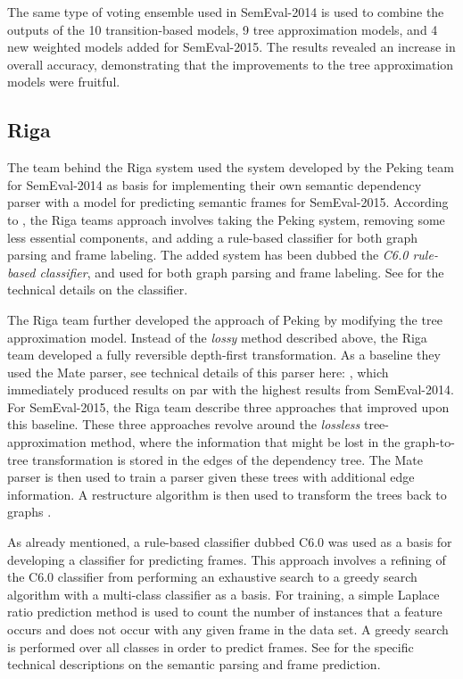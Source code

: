 The same type of voting ensemble used in SemEval-2014 is used to combine the outputs of the 10 transition-based models, 9 tree approximation models, and 4 new weighted models added for SemEval-2015. The results revealed an increase in overall accuracy, demonstrating that the improvements to the tree approximation models were fruitful.


\subsection{Riga}

The team behind the Riga system used the system developed by the Peking team for SemEval-2014 as basis for implementing their own semantic dependency parser with a model for predicting semantic frames for SemEval-2015. According to , the Riga teams approach involves taking the Peking system, removing some less essential components, and adding a rule-based classifier for both graph parsing and frame labeling. The added system has been dubbed the \textit{C6.0 rule-based classifier}, and used for both graph parsing and frame labeling. See  for the technical details on the classifier.

The Riga team further developed the approach of Peking by modifying the tree approximation model. Instead of the \textit{lossy} method described above, the Riga team developed a fully reversible depth-first transformation. As a baseline they used the Mate parser, see technical details of this parser here: \cite{Boh:10}, which immediately produced results on par with the highest results from SemEval-2014. For SemEval-2015, the Riga team describe three approaches that improved upon this baseline. These three approaches revolve around the \textit{lossless} tree-approximation method, where the information that might be lost in the graph-to-tree transformation is stored in the edges of the dependency tree. The Mate parser is then used to train a parser given these trees with additional edge information. A restructure algorithm is then used to transform the trees back to graphs \cite{Barzdins:Riga:15}.

As already mentioned, a rule-based classifier dubbed C6.0 was used as a basis for developing a classifier for predicting frames. This approach involves a refining of the C6.0 classifier from performing an exhaustive search to a greedy search algorithm with a multi-class classifier as a basis. For training, a simple Laplace ratio prediction method is used to count the number of instances that a feature occurs and does not occur with any given frame in the data set. A greedy search is performed over all classes in order to predict frames. See  for the specific technical descriptions on the semantic parsing and frame prediction.

